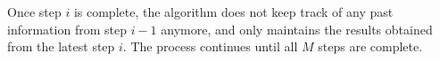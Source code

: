  Once step \(i\) is complete, the algorithm does not keep track of any past information from step \(i - 1\) anymore, and only maintains the results obtained from the latest step $i$. The process continues until all $M$ steps are complete.

\begin{comment}
    \textcolor{red}{I dont understand this - you need to rewrite}
Specifically, to understand how our algorithm works, we demonstrate our stepwise approach for {\tt ProbDep} by designing a \(M\)-partite graph. Figure \ref{fig:Example_3_6_a} demonstrates how such a graph looks like for 3 candidates $c_1, c_2, c_3$. The nodes in each partition represent the possible score values that a specific candidate can have. The first partition represents the possible score values for the candidate \(c\) whose winning probability we are interested in. The subsequent $M - 1$ partitions will each represent score values of other candidates $c_1, c_2, ..., c_{M-1}$. 

At step $i$, we move to partition \(i + 1\) and compute:

\[
P(c \geq c_{i+1} \mid c \geq c_1, c \geq c_2, \dots, c \geq c_{i})
\]

We then multiply this probability by the stored information from the previous step, which is:

\[
P(c \geq c_1, c \geq c_2, \dots, c \geq c_{i})
\]

This gives us:

\[
P(c \geq c_1, c \geq c_2, \dots, c \geq c_{i+1})
\]

As discussed earlier, we only need to store the results obtained from the most recent step. Hence, at step $i$, we only need to show partitions 1, i, and i + 1. 
\end{comment}


\begin{comment}
This will be the information that we need to store for the next step $i+1$. At this point in time, except the first partition which is the candidate of our interest and the partition $i$ in which we have stored the result from the most recent step, we can ignore the other previous partitions and save more memory. We keep track of the feasible scoring assignments by adding edges between score values that satisfy our conditions.     
\end{comment}


